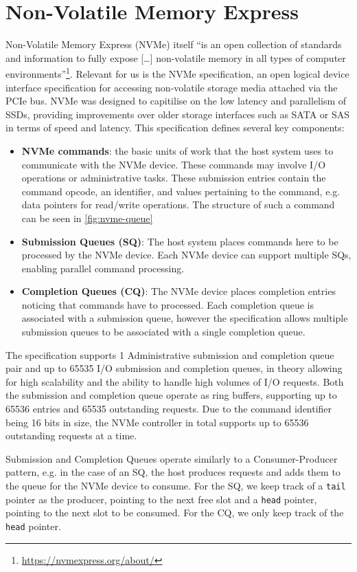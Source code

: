 \section{Non-Volatile Memory Express}
Non-Volatile Memory Express (NVMe) itself ``is an open collection of standards and information to fully expose [\ldots] non-volatile memory in all types of computer environments''\footnote{\url{https://nvmexpress.org/about/}}. Relevant for us is the NVMe specification, an open logical device interface specification for accessing non-volatile storage media attached via the PCIe bus. NVMe was designed to capitilise on the low latency and parallelism of SSDs, providing improvements over older storage interfaces such as SATA or SAS in terms of speed and latency. This specification defines several key components:

\begin{itemize}
    \item \textbf{NVMe commands}: the basic units of work that the host system uses to communicate with the NVMe device. These commands may involve I/O operations or administrative tasks. These submission entries contain the command opcode, an identifier, and values pertaining to the command, e.g. data pointers for read/write operations. The structure of such a command can be seen in \autoref{fig:nvme-queue}
    \item \textbf{Submission Queues (SQ)}: The host system places commands here to be processed by the NVMe device. Each NVMe device can support multiple SQs, enabling parallel command processing.
    \item \textbf{Completion Queues (CQ)}: The NVMe device places completion entries noticing that commands have to processed. Each completion queue is associated with a submission queue, however the specification allows multiple submission queues to be associated with a single completion queue.
\end{itemize}

The specification supports 1 Administrative submission and completion queue pair and up to 65535 I/O submission and completion queues, in theory allowing for high scalability and the ability to handle high volumes of I/O requests. Both the submission and completion queue operate as ring buffers, supporting up to 65536 entries and 65535 outstanding requests. Due to the command identifier being 16 bits in size, the NVMe controller in total supports up to 65536 outstanding requests at a time.

Submission and Completion Queues operate similarly to a Consumer-Producer pattern, e.g. in the case of an SQ, the host produces requests and adds them to the queue for the NVMe device to consume. For the SQ, we keep track of a \texttt{tail} pointer as the producer, pointing to the next free slot and a \texttt{head} pointer, pointing to the next slot to be consumed. For the CQ, we only keep track of the \texttt{head} pointer.

